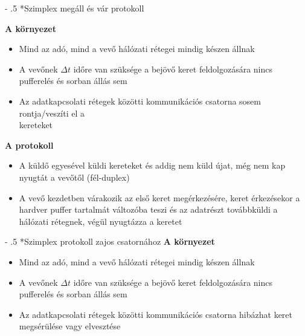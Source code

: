 \documentclass[12pt]{article}
\makeatletter
\renewcommand\paragraph{%
	\@startsection{paragraph}{4}{0mm}%
	{-\baselineskip}%
	{.5\baselineskip}%
	{\normalfont\normalsize\bfseries}}
\makeatother
\begin{document}
    \paragraph*{Szimplex megáll és vár protokoll}

    \textbf{\small A környezet}
    \begin{itemize}[leftmargin=7.5mm]
        \renewcommand{\labelitemi}{$\vcenter{\hbox{\tiny$\bullet$}}$}
        \item Mind az adó, mind a vevő hálózati rétegei mindig készen állnak
        \item A vevőnek $\Delta t$ időre van szüksége a bejövő keret feldolgozására
        \subitem nincs pufferelés és sorban állás sem
        \item Az adatkapcsolati rétegek közötti kommunikációs csatorna sosem rontja/veszíti el a\\
        kereteket
    \end{itemize}

    \noindent \textbf{\small A protokoll}
    \begin{itemize}[leftmargin=7.5mm]
        \renewcommand{\labelitemi}{$\vcenter{\hbox{\tiny$\bullet$}}$}
        \item A küldő egyesével küldi kereteket és addig nem küld újat, még nem kap nyugtát a vevőtől (fél-duplex)
        \item A vevő kezdetben várakozik az első keret megérkezésére, keret érkezésekor a hardver puffer tartalmát változóba teszi és az adatrészt továbbküldi a hálózati rétegnek, végül nyugtázza a keretet
    \end{itemize}

    \paragraph*{Szimplex protokoll zajos csatornához}
    \textbf{\small A környezet}
    \begin{itemize}[leftmargin=7.5mm]
        \renewcommand{\labelitemi}{$\vcenter{\hbox{\tiny$\bullet$}}$}
    	\item Mind az adó, mind a vevő hálózati rétegei mindig készen állnak
        \item A vevőnek $\Delta t$ időre van szüksége a bejövő keret feldolgozására
        \subitem nincs pufferelés és sorban állás sem
    	\item Az adatkapcsolati rétegek közötti kommunikációs csatorna hibázhat
        \subitem keret megsérülése vagy elvesztése
    \end{itemize}
    	 	
\end{document}
